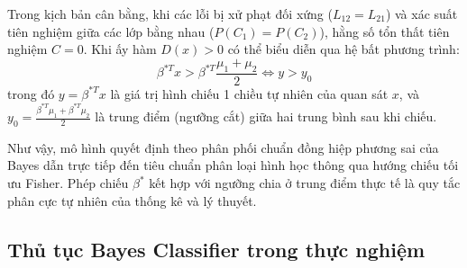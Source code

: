 Trong kịch bản cân bằng, khi các lỗi bị xử phạt đối xứng ($L_{12} = L_{21}$) và xác suất tiên nghiệm giữa các lớp bằng nhau ($P(C_1) = P(C_2)$), hằng số tổn thất tiên nghiệm $C = 0$. Khi ấy hàm $D(x) > 0$ có thể biểu diễn qua hệ bất phương trình:
\begin{equation}
    \beta^{*T} x > \beta^{*T} \frac{\mu_1 + \mu_2}{2} \iff y > y_0
\end{equation}
trong đó $y = \beta^{*T} x$ là giá trị hình chiếu 1 chiều tự nhiên của quan sát $x$, và $y_0 = \frac{\beta^{*T} \mu_1 + \beta^{*T} \mu_2}{2}$ là trung điểm (ngưỡng cắt) giữa hai trung bình sau khi chiếu. 

Như vậy, mô hình quyết định theo phân phối chuẩn đồng hiệp phương sai của Bayes dẫn trực tiếp đến tiêu chuẩn phân loại hình học thông qua hướng chiếu tối ưu Fisher. Phép chiếu $\beta^*$ kết hợp với ngưỡng chia ở trung điểm thực tế là quy tắc phân cực tự nhiên của thống kê và lý thuyết.

\subsection{Thủ tục Bayes Classifier trong thực nghiệm}

